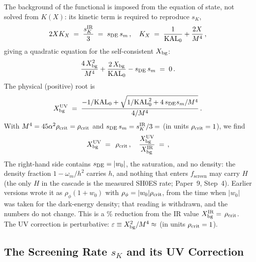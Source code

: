 \documentclass[12pt,a4paper]{article}
\newcommand{\KAL}{\mathrm{KAL}_0}
\newcommand{\fsc}{f_{\mathrm{screen}}}
\newcommand{\sK}{s_K}
\newcommand{\rhoc}{\rho_{\rm crit}}
\begin{document}
The background of the functional is imposed from the equation of state, not
solved from $K(X)$: its kinetic term is required to reproduce $\sK$,
\begin{equation}
  2X K_X \;=\; \frac{\sK^{\rm IR}}{3} \;=\; s_{\rm DE}\,s_m\,,
  \quad
  K_X \;=\; \frac{1}{\KAL} + \frac{2X}{M^4}\,,
\end{equation}
giving a quadratic equation for the self-consistent $X_{\rm bg}$:
\begin{equation}
  \frac{4\,X_{\rm bg}^2}{M^4} + \frac{2\,X_{\rm bg}}{\KAL}
  - s_{\rm DE}\,s_m \;=\; 0\,.
  \label{eq:quadratic}
\end{equation}
The physical (positive) root is
\begin{equation}
  X_{\rm bg}^{\rm UV}
  \;=\; \frac{-1/\KAL + \sqrt{1/\KAL^2 + 4\,s_{\rm DE}s_m/M^4}}
             {4/M^4}\,.
\end{equation}
With $M^4 = 45\alpha^2\rhoc = \val{_M4_UV_d2}\rhoc$ and
$s_{\rm DE}\,s_m = \sK^{\rm IR}/3 = \val{sK_tercio_d5}$ (in units $\rhoc = 1$),
we find
\begin{equation}
  X_{\rm bg}^{\rm UV} \;=\; \val{_X_UV_d5}\,\rhoc\,,
  \quad
  \frac{X_{\rm bg}^{\rm UV}}{X_{\rm bg}^{\rm IR}} \;=\; \val{X_UV_sobre_IR_d4}\,,
\end{equation}
The right-hand side contains $s_{\rm DE}=|w_0|$, the saturation, and no density:
the density fraction $1-\omega_m/h^2$ carries $h$, and nothing that enters $\fsc$
may carry $H$ (the only $H$ in the cascade is the measured SH0ES rate; Paper~9,
Step~4). Earlier versions wrote it as $\rho_\phi(1+w_0)$ with $\rho_\phi=|w_0|\rhoc$,
from the time when $|w_0|$ was taken for the dark-energy density; that reading
is withdrawn, and the numbers do not change. This is a \% reduction from the IR value $X_{\rm bg}^{\rm IR} = \val{X_bg_IR_d5}\,\rhoc$.
The UV correction is perturbative: $\varepsilon \equiv X_{\rm bg}^2/M^4
\approx \val{eps_UV}$ (in units $\rhoc=1$).

\subsection{The Screening Rate $\sK$ and its UV Correction}
\end{document}
